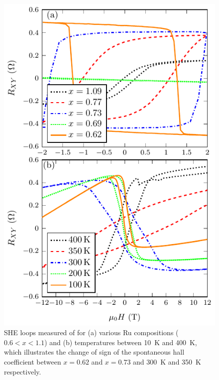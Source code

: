 \documentclass[reprint,aip,apl,floatfix,linenumbers,superscriptaddress]{revtex4-1}
\begin{document}
\begin{figure}
\includegraphics[width=1.0\columnwidth]{Transport-Fig2.pdf}
\caption{SHE loops measured of  for (a) various Ru compositions ($0.6<x<1.1$) and (b) temperatures between \SI{10}{\kelvin} and \SI{400}{\kelvin}, which illustrates the change of sign of the spontaneous hall coefficient between $x=0.62$ and $x=0.73$ and \SI{300}{\kelvin} and \SI{350}{\kelvin} respectively.}
\label{fig:she}
\end{figure}
\end{document}
